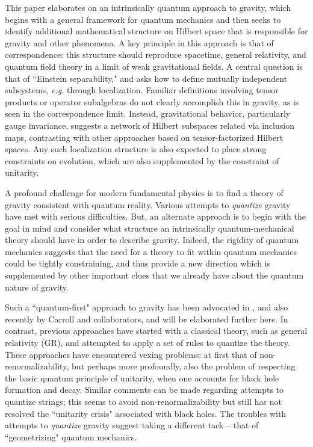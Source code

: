 This paper elaborates on an intrinsically quantum 
approach to gravity, which begins with a general framework for quantum mechanics and then 
seeks to identify additional mathematical structure on Hilbert space that is responsible for gravity and other phenomena.  A key principle in this approach is that of correspondence: this structure should reproduce spacetime, general relativity, and quantum field theory in a limit of weak gravitational fields.  A central question is that of ``Einstein separability," and asks how to define mutually independent subsystems, {\it e.g.} through localization.  Familiar definitions involving tensor products or operator subalgebras do not clearly accomplish this in gravity, as is seen in the correspondence limit.  Instead, gravitational behavior, particularly gauge invariance, suggests a network of Hilbert subspaces related via inclusion maps, contrasting with other approaches based on tensor-factorized Hilbert spaces.  Any such localization structure is also expected to place strong constraints on evolution, which are also supplemented by the constraint of unitarity.


\Date{}



A profound challenge for modern fundamental physics is to find a theory of gravity consistent with quantum reality.  Various attempts to {\it quantize} gravity have met with serious difficulties. But, an alternate approach is to begin with the goal in mind and consider what structure an intrinsically quantum-mechanical theory should have in order to describe gravity.  Indeed, the rigidity of quantum mechanics suggests that the need for a theory to fit within quantum mechanics could be tightly constraining, and thus provide a new direction which is supplemented by other important clues that we already have about the quantum nature of gravity.

Such a ``quantum-first" approach to gravity has been advocated in , and also recently by Carroll and collaborators, and will be elaborated further here.  In contrast, previous approaches have started with a classical theory, such as general relativity (GR), and attempted to apply a set of rules to quantize the theory.  These approaches have encountered vexing problems: at first that of non-renormalizability, but perhaps more profoundly, also the problem of respecting the basic quantum principle of unitarity, when one accounts for black hole formation and decay.  Similar comments can be made regarding attempts to quantize strings; this seems to avoid non-renormalizability but still has not resolved the ``unitarity crisis" associated with black holes.
The troubles with attempts to {\it quantize} gravity suggest taking a different tack -- that of ``geometrizing" quantum mechanics.

